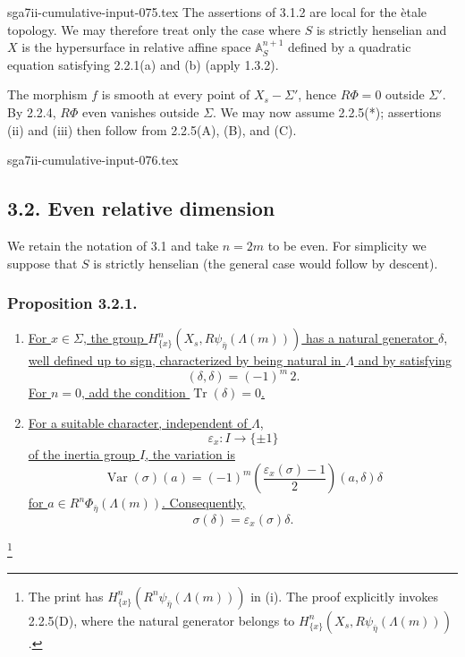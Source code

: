 \begin{filecontents*}{sga7ii-cumulative-input-075.tex}
The assertions of 3.1.2 are local for the \`etale topology.  We may
therefore treat only the case where $S$ is strictly henselian and
$X$ is the hypersurface in relative affine space
$\mathbb A^{n+1}_S$ defined by a quadratic equation satisfying
2.2.1(a) and (b) (apply 1.3.2).

The morphism $f$ is smooth at every point of $X_s-\Sigma'$, hence
$R\Phi=0$ outside $\Sigma'$.  By 2.2.4, $R\Phi$ even vanishes outside
$\Sigma$.  We may now assume 2.2.5(*); assertions (ii) and (iii) then
follow from 2.2.5(A), (B), and (C).
\end{filecontents*}
\begin{filecontents*}{sga7ii-cumulative-input-076.tex}
\subsection*{3.2. Even relative dimension}

We retain the notation of 3.1 and take $n=2m$ to be even.  For
simplicity we suppose that $S$ is strictly henselian (the general
case would follow by descent).

\subsubsection*{Proposition 3.2.1.}
\begin{enumerate}
\item[(i)] \underline{For $x\in\Sigma$, the group
$H^n_{\{x\}}(X_s,R\psi_{\bar\eta}(\Lambda(m)))$ has a natural
generator $\delta$, well defined up to sign, characterized by being
natural in $\Lambda$ and by satisfying}
\[
(\delta,\delta)=(-1)^m\,2.
\]
\underline{For $n=0$, add the condition
$\operatorname{Tr}(\delta)=0$.}

\item[(ii)] \underline{For a suitable character, independent of
$\Lambda$,}
\[
\varepsilon_x:I\longrightarrow\{\pm1\}
\]
\underline{of the inertia group $I$, the variation is}
\[
\operatorname{Var}(\sigma)(a)
=(-1)^m\left(\frac{\varepsilon_x(\sigma)-1}{2}\right)
(a,\delta)\delta
\]
\underline{for $a\in R^n\Phi_{\bar\eta}(\Lambda(m))$.  Consequently,}
\[
\sigma(\delta)=\varepsilon_x(\sigma)\delta.
\]
\end{enumerate}
\footnote{The print has
$H^n_{\{x\}}(R^n\psi_{\bar\eta}(\Lambda(m)))$ in (i).  The proof
explicitly invokes 2.2.5(D), where the natural generator belongs to
$H^n_{\{x\}}(X_s,R\psi_{\bar\eta}(\Lambda(m)))$.}


\end{filecontents*}
